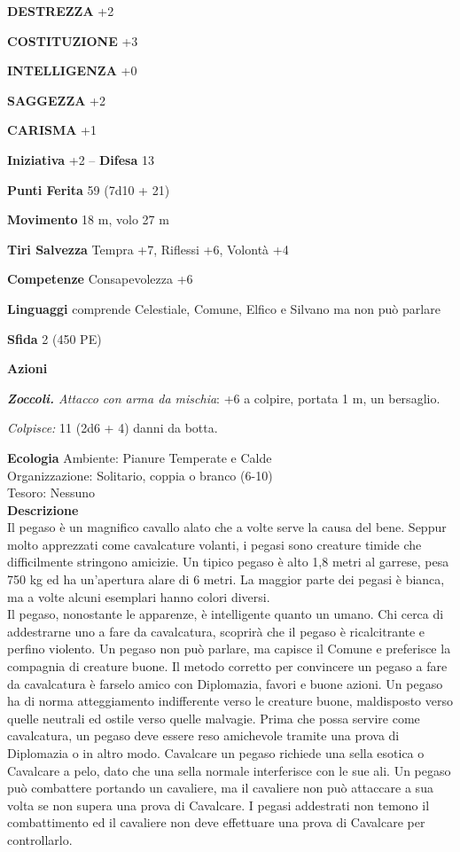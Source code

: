 \begin{multicols}{2}
\textbf{DESTREZZA} +2

\textbf{COSTITUZIONE} +3

\textbf{INTELLIGENZA} +0

\textbf{SAGGEZZA} +2

\textbf{CARISMA} +1

\textbf{Iniziativa} +2 -- \textbf{Difesa} 13

\textbf{Punti Ferita} 59 (7d10 + 21)

\textbf{Movimento} 18 m, volo 27 m

\textbf{Tiri Salvezza} Tempra +7, Riflessi +6, Volontà +4

\textbf{Competenze} Consapevolezza +6

\textbf{Linguaggi} comprende Celestiale, Comune, Elfico e Silvano ma non può parlare

\textbf{Sfida} 2 (450 PE)

\textbf{Azioni}

\emph{\textbf{Zoccoli.} Attacco con arma da mischia}: +6 a colpire, portata 1 m, un bersaglio.

\emph{Colpisce:} 11 (2d6 + 4) danni da botta.

\textbf{Ecologia}
Ambiente: Pianure Temperate e Calde\\
Organizzazione: Solitario, coppia o branco (6-10)\\
Tesoro: Nessuno\\
\textbf{Descrizione}\\
Il pegaso è un magnifico cavallo alato che a volte serve la causa del bene. Seppur molto apprezzati come cavalcature volanti, i pegasi sono creature timide che difficilmente stringono amicizie. Un tipico pegaso è alto 1,8 metri al garrese, pesa 750 kg ed ha un'apertura alare di 6 metri. La maggior parte dei pegasi è bianca, ma a volte alcuni esemplari hanno colori diversi.\\

Il pegaso, nonostante le apparenze, è intelligente quanto un umano. Chi cerca di addestrarne uno a fare da cavalcatura, scoprirà che il pegaso è ricalcitrante e perfino violento. Un pegaso non può parlare, ma capisce il Comune e preferisce la compagnia di creature buone. Il metodo corretto per convincere un pegaso a fare da cavalcatura è farselo amico con Diplomazia, favori e buone azioni. Un pegaso ha di norma atteggiamento indifferente verso le creature buone, maldisposto verso quelle neutrali ed ostile verso quelle malvagie. Prima che possa servire come cavalcatura, un pegaso deve essere reso amichevole tramite una prova di Diplomazia o in altro modo. Cavalcare un pegaso richiede una sella esotica o Cavalcare a pelo, dato che una sella normale interferisce con le sue ali. Un pegaso può combattere portando un cavaliere, ma il cavaliere non può attaccare a sua volta se non supera una prova di Cavalcare. I pegasi addestrati non temono il combattimento ed il cavaliere non deve effettuare una prova di Cavalcare per controllarlo.\\


\end{multicols}
